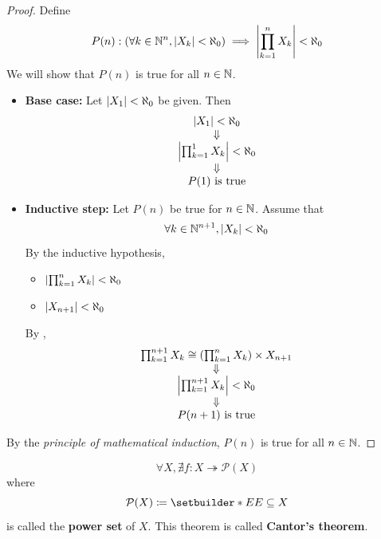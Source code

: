 \begin{proof}
    Define
    \[
    P(n): \paren*{\forall k \in \N^{n}, \abs*{X_{k}} < \aleph_{0}} \implies \abs*{\prod_{k = 1}^{n} X_{k}} < \aleph_{0}
    \]
    We will show that $P(n)$ is true for all $n \in \N$.
    \begin{itemize}
        \item \textbf{Base case:} Let $\abs*{X_{1}} < \aleph_{0}$ be given. Then
        \[
        \begin{array}{c}
            \abs*{X_{1}} < \aleph_{0} \\
            \Downarrow \\
            \abs*{\prod_{k = 1}^{1} X_{k}} < \aleph_{0} \\
            \Downarrow \\
            P(1) \text{ is true}
        \end{array}
        \]
        \item \textbf{Inductive step:} Let $P(n)$ be true for $n \in \N$. Assume that
        \[
        \forall k \in \N^{n + 1}, \abs*{X_{k}} < \aleph_{0}
        \]
        By the inductive hypothesis,
        \begin{itemize}
            \item $\abs*{\prod_{k = 1}^{n} X_{k}} < \aleph_{0}$
            \item $\abs*{X_{n + 1}} < \aleph_{0}$
        \end{itemize}
        By ,
        \[
        \begin{array}{c}
            \prod_{k = 1}^{n + 1} X_{k} \cong \paren*{\prod_{k = 1}^{n} X_{k}} \times X_{n + 1} \\
            \Downarrow \\
            \abs*{\prod_{k = 1}^{n + 1} X_{k}} < \aleph_{0} \\
            \Downarrow \\
            P(n + 1) \text{ is true}
        \end{array}
        \]
    \end{itemize}
    By the \emph{principle of mathematical induction}, $P(n)$ is true for all $n \in \N$.
\end{proof}

\bigskip

\begin{theorem} \label{an:thm:cantors-theorem}
    \[
    \forall X, \nexists f: X \twoheadrightarrow \mathcal{P}(X)
    \]
    where
    \[
    \mathcal{P}(X) \coloneqq \setbuilder*{E}{E \subseteq X}
    \]
    is called the \textbf{power set} of $X$. This theorem is called \textbf{Cantor's theorem}.
\end{theorem}

